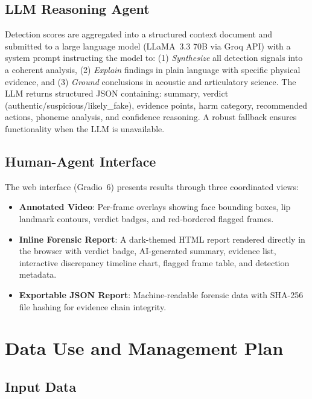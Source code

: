 \documentclass[11pt,a4paper]{article}
\begin{document}
\subsection{LLM Reasoning Agent}

Detection scores are aggregated into a structured context document and submitted to a large language model (LLaMA~3.3 70B via Groq API) with a system prompt instructing the model to: (1) \emph{Synthesize} all detection signals into a coherent analysis, (2) \emph{Explain} findings in plain language with specific physical evidence, and (3) \emph{Ground} conclusions in acoustic and articulatory science. The LLM returns structured JSON containing: summary, verdict (authentic/suspicious/likely\_fake), evidence points, harm category, recommended actions, phoneme analysis, and confidence reasoning. A robust fallback ensures functionality when the LLM is unavailable.

\subsection{Human-Agent Interface}

The web interface (Gradio~6) presents results through three coordinated views:

\begin{itemize}[leftmargin=2em]
    \item \textbf{Annotated Video}: Per-frame overlays showing face bounding boxes, lip landmark contours, verdict badges, and red-bordered flagged frames.
    \item \textbf{Inline Forensic Report}: A dark-themed HTML report rendered directly in the browser with verdict badge, AI-generated summary, evidence list, interactive discrepancy timeline chart, flagged frame table, and detection metadata.
    \item \textbf{Exportable JSON Report}: Machine-readable forensic data with SHA-256 file hashing for evidence chain integrity.
\end{itemize}


\section{Data Use and Management Plan}

\subsection{Input Data}
\end{document}
